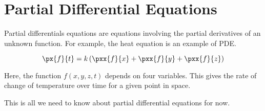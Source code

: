 

\chapter{Partial Differential Equations}

\bigbreak

Partial differentials equations are equations involving the partial derivatives of an unknown function.
For example, the heat equation is an example of PDE.

$$ \px{f}{t} = k\left( \pxx{f}{x} + \pxx{f}{y} + \pxx{f}{z} \right) $$

Here, the function $f(x, y, z, t)$ depends on four variables.
This gives the rate of change of temperature over time for a given point in space.

This is all we need to know about partial differential equations for now.


